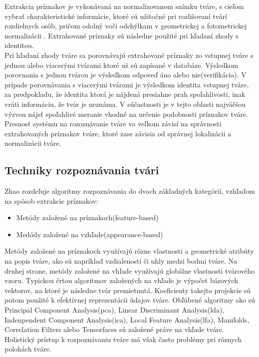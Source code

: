 \indent Extrakcia príznakov je vykonávaná na normalizovanom snímku tváre, s cieľom vybrať charakteristické informácie, ktoré sú užitočné pri rozlišovaní tvárí rozdielnych osôb,
pričom odolný voči odchýlkam v geometrickej a fotometrickej normalizácii \cite{handbookface}.
Extrahované príznaky sú následne použité pri hľadaní zhody s identitou.\\

\indent Pri hľadaní zhody tváre sa porovnávajú extrahované príznaky zo vstupnej tváre s jednou alebo viacerými tvárami ktoré už sú zapísané v databáze.
Výsledkom porovnania s jednou tvárou je výsledkom odpoveď áno alebo nie(verifikácia).
V prípade porovnávania s viacerými tvárami je výsledkom identita vstupnej tváre, za predpokladu, že identita ktorá je nájdená presiahne prah spoľahlivosti,
inak vráti informáciu, že tvár je neznáma.
V súčastnosti je v tejto oblasti najväčšou výzvou nájsť spoľahlivé meranie vhodné na určenie podobnosti príznakov tváre.\\
\indent Presnosť systému na rozoznávanie tváre vo veľkom závisí na správnosti extrahovaných príznakov tváre, ktoré zase závisia od správnej lokalizácii a normalizácii tváre.

\subsection{Techniky rozpoznávania tvári}
Zhao rozdeľuje\cite{zhao2003face} algoritmy rozpoznávania do dvoch základných kategórií, vzhľadom na spôsob extrakcie príznakov:

\begin{itemize}
	\item Metódy založené na príznakoch(feature-based)
	\item Medódy založené na vzhľade(appearance-based)
\end{itemize}

Metódy založené na príznakoch využívajú rôzne vlastnosti a geometrické atribúty na popis tváre, ako sú napríklad vzdialenosti či uhly medzi bodmi tváre.
Na druhej strane, metódy založené na vhľade využívajú globálne vlastnosti tvárového vzoru.
Typickou črtou algoritmov založených na vhľade je výpočet bázových vektorov, na ktoré je následne tvár premietnutá.
Koeficienty takejto projekcie sú potom použité k efektívnej reprezentácii údajov tváre\cite{handbookbio}.
Obľúbené algoritmy ako sú Principal Component Analysis(\acrshort{pca}), Linear Discriminant Analysis(\acrshort{lda}), Indenpendent Component Analysis(\acrshort{ica}),
Local Feature Analysis(\acrshort{lfa}), Manifolds, Correlation Filters alebo Tensorfaces sú založené práve na vhľade tváre.
Holistický prístup k rozpoznávaniu tváre má však často problémy pri rôznych polohách tváre\cite{handbookbio}.

